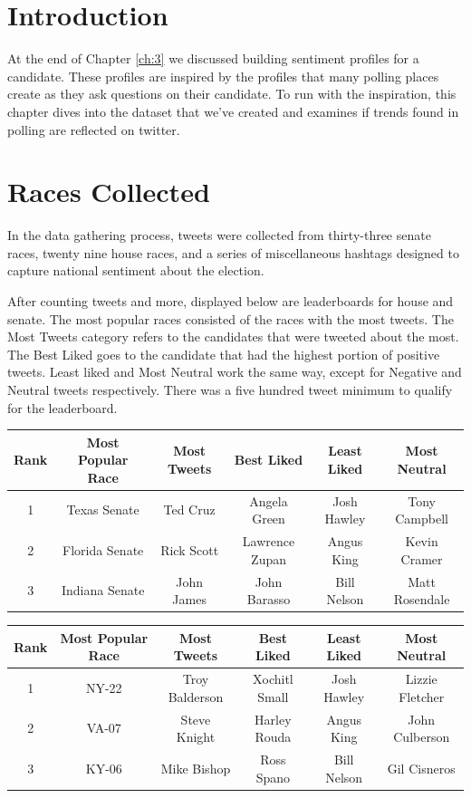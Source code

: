 \documentclass[11pt, twoside, reqno]{article}
\begin{document}
\section{Introduction}
\hspace{0.2in}At the end of Chapter \ref{ch:3} we discussed building sentiment profiles for a candidate. These profiles are inspired by the profiles that many polling places create as they ask questions on their candidate. To run with the inspiration, this chapter dives into the dataset that we've created and examines if trends found in polling are reflected on twitter.  

\section{Races Collected}
\hspace{0.2in}In the data gathering process, tweets were collected from thirty-three senate races, twenty nine house races, and a series of miscellaneous hashtags designed to capture national sentiment about the election. 

After counting tweets and more, displayed below are leaderboards for house and senate. The most popular races consisted of the races with the most tweets. The Most Tweets category refers to the candidates that were tweeted about the most. The Best Liked goes to the candidate that had the highest portion of positive tweets. Least liked and Most Neutral work the same way, except for Negative and Neutral tweets respectively. There was a five hundred tweet minimum to qualify for the leaderboard. 
\begin{center}
\begin{tabular}{ |c|c|c|c|c|c|} 
	\hline
	Rank & Most Popular Race & Most Tweets & Best Liked & Least Liked & Most Neutral \\
 	\hline 
	1 & Texas Senate & Ted Cruz & Angela Green & Josh Hawley & Tony Campbell\\
  	\hline
	2 & Florida Senate & Rick Scott & Lawrence Zupan & Angus King & Kevin Cramer\\ 
	\hline
	3 & Indiana Senate & John James & John Barasso & Bill Nelson& Matt Rosendale\\
	\hline
\end{tabular}
\end{center}
\begin{center}
\begin{tabular}{ |c|c|c|c|c|c|} 
	\hline
	Rank & Most Popular Race & Most Tweets & Best Liked & Least Liked & Most Neutral \\
 	\hline 
	1 & NY-22 & Troy Balderson & Xochitl Small & Josh Hawley & Lizzie Fletcher\\
  	\hline
	2 & VA-07 & Steve Knight & Harley Rouda & Angus King & John Culberson\\ 
	\hline
	3 & KY-06 & Mike Bishop & Ross Spano & Bill Nelson& Gil Cisneros\\
	\hline
\end{tabular}
\end{center}
\end{document}

